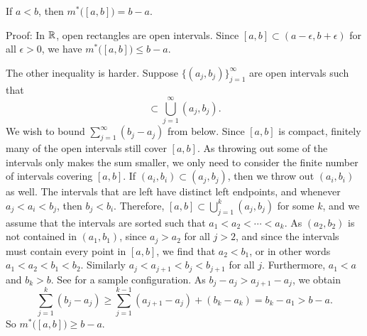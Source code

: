 \begin{example}
If $a < b$, then $m^*\bigl([a,b]\bigr) = b-a$.

Proof:
In ${\mathbb{R}}$, open rectangles are open intervals.
Since $[a,b] \subset (a-\epsilon,b+\epsilon)$ for all $\epsilon > 0$,
we have
$m^*\bigl([a,b]\bigr) \leq b-a$.

The other inequality is harder.
Suppose $\bigl\{ (a_j,b_j) \bigr\}_{j=1}^\infty$ are open intervals such that
\begin{equation*}
[a,b] \subset \bigcup_{j=1}^\infty (a_j,b_j) .
\end{equation*}
We wish to bound $\sum_{j=1}^\infty (b_j-a_j)$ from below.
Since $[a,b]$ is compact, finitely many of the open intervals
still cover $[a,b]$.  As throwing out some of the intervals only makes the
sum smaller, we only need to consider the finite number of intervals
covering $[a,b]$.
If $(a_i,b_i) \subset (a_j,b_j)$, then we throw out
$(a_i,b_i)$ as well.
The intervals that are left
have distinct left endpoints, and whenever
$a_j < a_i < b_j$, then $b_j < b_i$.
Therefore,
$[a,b] \subset \bigcup_{j=1}^k (a_j,b_j)$ for some $k$, and
we assume that the intervals are sorted such that $a_1 < a_2 < \cdots <
a_k$.  As $(a_2,b_2)$ is not contained in $(a_1,b_1)$,
since $a_j > a_2$ for all $j > 2$, and since the intervals
must contain every point in $[a,b]$, we find that $a_2 < b_1$, or in
other words
$a_1 < a_2 < b_1 < b_2$.  Similarly
$a_j < a_{j+1} < b_j < b_{j+1}$ for all $j$.
Furthermore, $a_1 < a$ and $b_k > b$.
See  for a sample configuration.
As $b_j-a_j > a_{j+1}-a_j$, we obtain
\begin{equation*}
\sum_{j=1}^k (b_j-a_j)
\geq
\sum_{j=1}^{k-1} (a_{j+1}-a_j)
+
(b_k-a_k)
=
b_k-a_1 > b-a .
\end{equation*}
So $m^*\bigl([a,b]\bigr) \geq b-a$.
\begin{myfigureht}
\caption{Open intervals covering $[a,b]$ which satisfy
$a_j < a_{j+1} < b_j < b_{j+1}$ for all $j$.\label{fig:measureinterval}}
\end{myfigureht}
\end{example}

